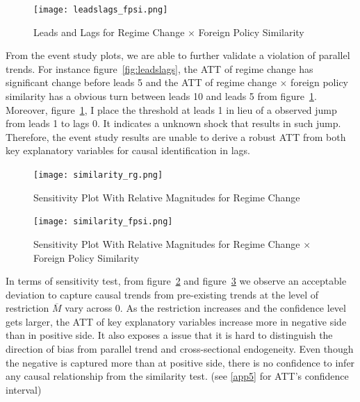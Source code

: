 \documentclass[12pt,a4paper]{article}
\begin{document}
\begin{figure}[!hptb]
\centering
\texttt{[image: leadslags\_fpsi.png]}
\caption{\label{fig:fpsi}Leads and Lags for Regime Change $\times$ Foreign Policy Similarity}
\end{figure}
\noindent From the event study plots, we are able to further validate a violation of parallel trends. For instance figure~\ref{fig:leadslags}, the ATT of regime change has significant change before leads 5 and the ATT of regime change $\times$ foreign policy similarity has a obvious turn between leads 10 and leads 5 from figure~\ref{fig:fpsi}. Moreover, figure~\ref{fig:fpsi}, I place the threshold at leads 1 in lieu of a observed jump from leads 1 to lags 0. It indicates a unknown shock that results in such jump. Therefore, the event study results are unable to derive a robust ATT from both key explanatory variables for causal identification in lags.

\begin{figure}[!hptb]
\centering
\texttt{[image: similarity\_rg.png]}
\caption{\label{fig:simi_rg}Sensitivity Plot With Relative Magnitudes for Regime Change}
\end{figure}

\begin{figure}[!hptb]
\centering
\texttt{[image: similarity\_fpsi.png]}
\caption{\label{fig:simi_fpsi}Sensitivity Plot With Relative Magnitudes for Regime Change $\times$ Foreign Policy Similarity}
\end{figure}
\noindent In terms of sensitivity test, from figure~\ref{fig:simi_rg} and figure~\ref{fig:simi_fpsi} we observe an acceptable deviation to capture causal trends from pre-existing trends at the level of restriction $\overline{M}$ vary across 0. As the restriction increases and the confidence level gets larger, the ATT of key explanatory variables increase more in negative side than in positive side. It also exposes a issue that it is hard to distinguish the direction of bias from parallel trend and cross-sectional endogeneity. Even though the negative is captured more than at positive side, there is no confidence to infer any causal relationship from the similarity test. (see \ref{app5} for ATT's confidence interval)
\end{document}
